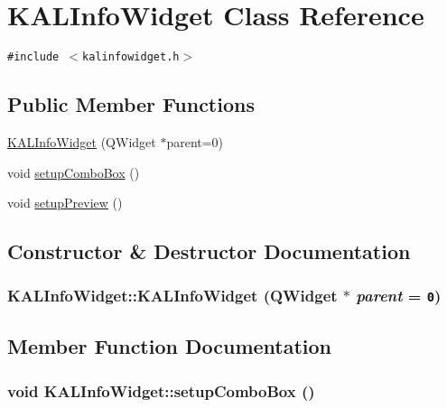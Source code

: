 \hypertarget{class_k_a_l_info_widget}{
\section{KALInfoWidget Class Reference}
\label{class_k_a_l_info_widget}
}
{\tt \#include $<$kalinfowidget.h$>$}

\subsection*{Public Member Functions}
\begin{CompactItemize}
\item 
\hyperlink{class_k_a_l_info_widget_424a58ac6fc63e9769b0453af136b098}{KALInfoWidget} (QWidget $\ast$parent=0)
\item 
void \hyperlink{class_k_a_l_info_widget_3bf6730410c45cc382f5c70c16e9f111}{setupComboBox} ()
\item 
void \hyperlink{class_k_a_l_info_widget_6f960a8c7318fd2b8b29001f6d1fdcbb}{setupPreview} ()
\end{CompactItemize}


\subsection{Constructor \& Destructor Documentation}
\hypertarget{class_k_a_l_info_widget_424a58ac6fc63e9769b0453af136b098}{
\subsubsection[{KALInfoWidget}]{\setlength{\rightskip}{0pt plus 5cm}KALInfoWidget::KALInfoWidget (QWidget $\ast$ {\em parent} = {\tt 0})}}
\label{class_k_a_l_info_widget_424a58ac6fc63e9769b0453af136b098}




\subsection{Member Function Documentation}
\hypertarget{class_k_a_l_info_widget_3bf6730410c45cc382f5c70c16e9f111}{
\subsubsection[{setupComboBox}]{\setlength{\rightskip}{0pt plus 5cm}void KALInfoWidget::setupComboBox ()}}
\label{class_k_a_l_info_widget_3bf6730410c45cc382f5c70c16e9f111}


